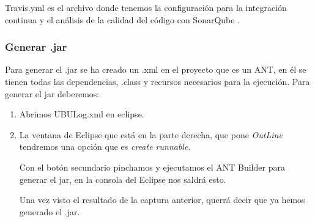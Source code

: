 Travis.yml es el archivo donde tenemos la configuración para la integración continua y el análisis de la calidad del código con SonarQube \cite{web:travis,web:sonarqube}.

\subsubsection{Generar .jar}\label{generar-jar}

Para generar el .jar se ha creado un .xml en el proyecto que es un ANT, en él se tienen todas las dependencias, .class y recursos necesarios para la ejecución. Para generar el jar deberemos:

\begin{enumerate}
	\tightlist
	\item
	Abrimos UBULog.xml en eclipse.
	\newpage\item
	La ventana de Eclipse que está en la parte derecha, que pone \emph{OutLine} tendremos una opción que es \emph{create runnable}.
	
	
	Con el botón secundario pinchamos y ejecutamos el ANT Builder para generar el jar, en la consola del Eclipse nos saldrá esto.
	
	
	Una vez visto el resultado de la captura anterior, querrá decir que ya hemos generado el .jar.
	
\end{enumerate}

